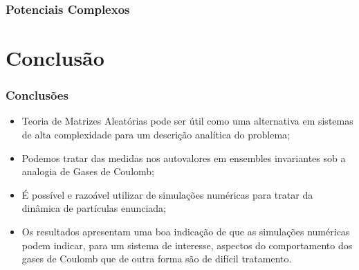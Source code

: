 \begin{frame}
	\frametitle{Potenciais Complexos}
\end{frame}


\section{Conclusão}

\begin{frame}
	\frametitle{Conclusões}
	
	\begin{itemize}
		\item<1> Teoria de Matrizes Aleatórias pode ser útil como uma alternativa em sistemas de alta complexidade para um descrição analítica do problema;
		\item<2> Podemos tratar das medidas nos autovalores em ensembles invariantes sob a analogia de Gases de Coulomb;
		\item<3> É possível e razoável utilizar de simulações numéricas para tratar da dinâmica de partículas enunciada;
		\item<4>  Os resultados apresentam uma boa indicação de que as simulações numéricas podem indicar, para um sistema de interesse, aspectos do comportamento dos gases de Coulomb que de outra forma são de difícil tratamento.
	\end{itemize}
\end{frame}


